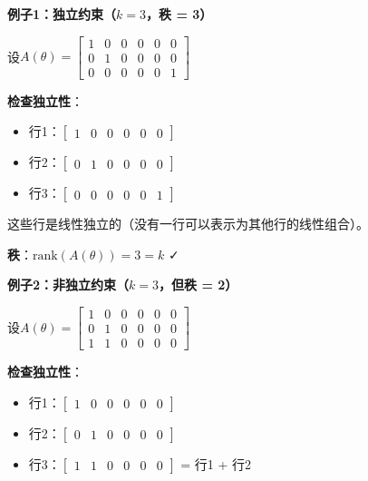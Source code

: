 \documentclass[12pt,a4paper]{article}
\begin{document}
\textbf{例子1：独立约束（$k = 3$，秩 = 3）}

设$A(\theta) = \begin{bmatrix}
1 & 0 & 0 & 0 & 0 & 0 \\  %
0 & 1 & 0 & 0 & 0 & 0 \\  %
0 & 0 & 0 & 0 & 0 & 1     %
\end{bmatrix}$

\textbf{检查独立性}：
\begin{itemize}
\item 行1：$\begin{bmatrix} 1 & 0 & 0 & 0 & 0 & 0 \end{bmatrix}$
\item 行2：$\begin{bmatrix} 0 & 1 & 0 & 0 & 0 & 0 \end{bmatrix}$
\item 行3：$\begin{bmatrix} 0 & 0 & 0 & 0 & 0 & 1 \end{bmatrix}$
\end{itemize}

这些行是线性独立的（没有一行可以表示为其他行的线性组合）。

\textbf{秩}：$\text{rank}(A(\theta)) = 3 = k$ ✓

\textbf{例子2：非独立约束（$k = 3$，但秩 = 2）}

设$A(\theta) = \begin{bmatrix}
1 & 0 & 0 & 0 & 0 & 0 \\  %
0 & 1 & 0 & 0 & 0 & 0 \\  %
1 & 1 & 0 & 0 & 0 & 0     %
\end{bmatrix}$

\textbf{检查独立性}：
\begin{itemize}
\item 行1：$\begin{bmatrix} 1 & 0 & 0 & 0 & 0 & 0 \end{bmatrix}$
\item 行2：$\begin{bmatrix} 0 & 1 & 0 & 0 & 0 & 0 \end{bmatrix}$
\item 行3：$\begin{bmatrix} 1 & 1 & 0 & 0 & 0 & 0 \end{bmatrix}$ = 行1 + 行2
\end{itemize}
\end{document}
